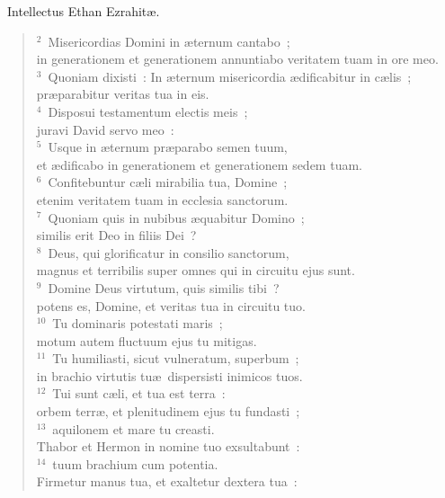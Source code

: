 ~\lettrine[lines=10,image=true,loversize=0.05,lraise=-0.03]{I}{}ntellectus Ethan Ezrahit\ae .
\begin{flushleft}\begin{verse}\vspace{6pt}${}^{2}$~Misericordias Domini in \ae ternum cantabo~;\\ in generationem et generationem annuntiabo veritatem tuam in ore meo.\\
${}^{3}$~Quoniam dixisti~: In \ae ternum misericordia \ae dificabitur in c\ae lis~;\\ pr\ae parabitur veritas tua in eis.\\
${}^{4}$~Disposui testamentum electis meis~;\\ juravi David servo meo~:\\
${}^{5}$~Usque in \ae ternum pr\ae parabo semen tuum,\\ et \ae dificabo in generationem et generationem sedem tuam.\\
${}^{6}$~Confitebuntur c\ae li mirabilia tua, Domine~;\\ etenim veritatem tuam in ecclesia sanctorum.\\
${}^{7}$~Quoniam quis in nubibus \ae quabitur Domino~;\\ similis erit Deo in filiis Dei~?\\
${}^{8}$~Deus, qui glorificatur in consilio sanctorum,\\ magnus et terribilis super omnes qui in circuitu ejus sunt.\\
${}^{9}$~Domine Deus virtutum, quis similis tibi~?\\ potens es, Domine, et veritas tua in circuitu tuo.\\
${}^{10}$~Tu dominaris potestati maris~;\\ motum autem fluctuum ejus tu mitigas.\\
${}^{11}$~Tu humiliasti, sicut vulneratum, superbum~;\\ in brachio virtutis tu\ae\ dispersisti inimicos tuos.\\
${}^{12}$~Tui sunt c\ae li, et tua est terra~:\\ orbem terr\ae , et plenitudinem ejus tu fundasti~;\\
${}^{13}$~aquilonem et mare tu creasti.\\ Thabor et Hermon in nomine tuo exsultabunt~:\\
${}^{14}$~tuum brachium cum potentia.\\ Firmetur manus tua, et exaltetur dextera tua~:\\

\end{verse}
\end{flushleft}
